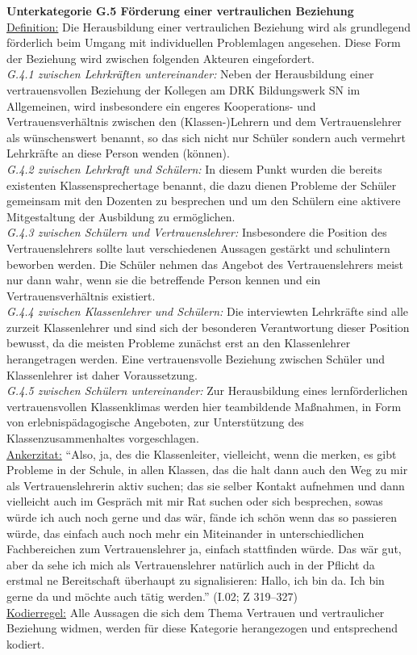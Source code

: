 \textbf{Unterkategorie G.5 Förderung einer vertraulichen Beziehung}\\
\underline{Definition:} Die Herausbildung einer vertraulichen Beziehung wird als grundlegend förderlich beim Umgang mit individuellen Problemlagen angesehen. Diese Form der Beziehung wird zwischen folgenden Akteuren eingefordert.\\
\textit{G.4.1 zwischen Lehrkräften untereinander:} Neben der Herausbildung einer vertrauensvollen Beziehung der Kollegen am DRK Bildungswerk SN im Allgemeinen, wird insbesondere ein engeres Kooperations- und Vertrauensverhältnis zwischen den (Klassen-)Lehrern und dem Vertrauenslehrer als wünschenswert benannt, so das sich nicht nur Schüler sondern auch vermehrt Lehrkräfte an diese Person wenden (können).\\
\textit{G.4.2 zwischen Lehrkraft und Schülern:} In diesem Punkt wurden die bereits existenten Klassensprechertage benannt, die dazu dienen Probleme der Schüler gemeinsam mit den Dozenten zu besprechen und um den Schülern eine aktivere Mitgestaltung der Ausbildung zu ermöglichen.\\
\textit{G.4.3 zwischen Schülern und Vertrauenslehrer:} Insbesondere die Position des Vertrauenslehrers sollte laut verschiedenen Aussagen gestärkt und schulintern beworben werden. Die Schüler nehmen das Angebot des Vertrauenslehrers meist nur dann wahr, wenn sie die betreffende Person kennen und ein Vertrauensverhältnis existiert.\\
\textit{G.4.4 zwischen Klassenlehrer und Schülern:} Die interviewten Lehrkräfte sind alle zurzeit Klassenlehrer und sind sich der besonderen Verantwortung dieser Position bewusst, da die meisten Probleme zunächst erst an den Klassenlehrer herangetragen werden. Eine vertrauensvolle Beziehung zwischen Schüler und Klassenlehrer ist daher Voraussetzung.\\
\textit{G.4.5 zwischen Schülern untereinander:} Zur Herausbildung eines lernförderlichen vertrauensvollen Klassenklimas werden hier teambildende Maßnahmen, in Form von erlebnispädagogische Angeboten, zur Unterstützung des Klassenzusammenhaltes vorgeschlagen.\\
\underline{Ankerzitat:} "`Also, ja, des die Klassenleiter, vielleicht, wenn die merken, es gibt Probleme in der Schule, in allen Klassen, das die halt dann auch den Weg zu mir als Vertrauenslehrerin aktiv suchen; das sie selber Kontakt aufnehmen und dann vielleicht auch im Gespräch mit mir Rat suchen oder sich besprechen, sowas würde ich auch noch gerne und das wär, fände ich schön wenn das so passieren würde, das einfach auch noch mehr ein Miteinander in unterschiedlichen Fachbereichen zum Vertrauenslehrer ja, einfach stattfinden würde. Das wär gut, aber da sehe ich mich als Vertrauenslehrer natürlich auch in der Pflicht da erstmal ne Bereitschaft überhaupt zu signalisieren: Hallo, ich bin da. Ich bin gerne da und möchte auch tätig werden."' (I.02; Z 319--327)\\
\underline{Kodierregel:} Alle Aussagen die sich dem Thema Vertrauen und vertraulicher Beziehung widmen, werden für diese Kategorie herangezogen und entsprechend kodiert.\\


